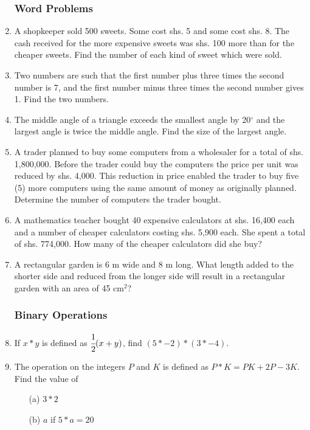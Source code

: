 \begin{enumerate}
		\subsubsection{Word Problems}
	\item A shopkeeper sold 500 sweets. Some cost shs. 5 and some cost shs. 8. The cash received for the more expensive sweets was shs. 100 more than for the cheaper sweets. Find the number of each kind of sweet which were sold.
	
	\item Two numbers are such that the first number plus three times the second number is 7, and the first number minus three times the second number gives 1. Find the two numbers.
	
	\item The middle angle of a triangle exceeds the smallest angle by 20$^\circ$ and the largest angle is twice the middle angle. Find the size of the largest angle.
	
	\item A trader planned to buy some computers from a wholesaler for a total of shs. 1,800,000. Before the trader could buy the computers the price per unit was reduced by shs. 4,000. This reduction in price enabled the trader to buy five (5) more computers using the same amount of  money as originally planned. Determine the number of computers the trader bought.
		
	\item A mathematics teacher bought 40 expensive calculators at shs. 16,400 each and a number of cheaper calculators costing shs. 5,900 each. She spent a total of shs. 774,000. How many of the cheaper calculators did she buy?
	
	\item A rectangular garden is 6 m wide and 8 m long. What length added to the shorter side and reduced from the longer side will result in a rectangular garden with an area of 45 cm$^2$?
		
		\subsubsection{Binary Operations}
	\item If $x * y$ is defined as $\cfrac{1}{2}(x + y)$, find $(5 * -2) * (3 * -4)$.
		
	\item The operation on the integers $P$ and $K$ is defined as $P * K = PK + 2P - 3K$.\\
	Find the value of
		\begin{itemize}
		\item[(a)] $3 * 2$
		\item[(b)] $a$ if $ 5 * a = 20$
		\end{itemize}
		

\end{enumerate}
